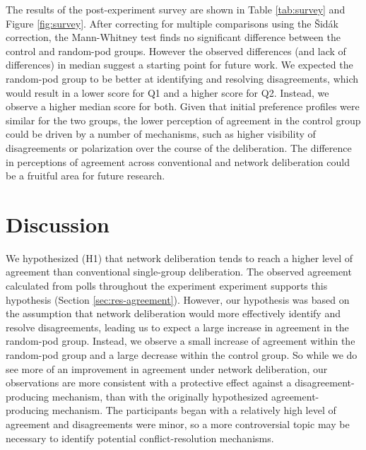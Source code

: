 {The results of the post-experiment survey are shown in Table \ref{tab:survey} and Figure \ref{fig:survey}.
After correcting for multiple comparisons using the Šidák correction, the Mann-Whitney test finds no significant difference between the control and random-pod groups.
However the observed differences (and lack of differences) in median suggest a starting point for future work.
We expected the random-pod group to be better at identifying and resolving disagreements, which would result in a lower score for Q1 and a higher score for Q2.
Instead, we observe a higher median score for both.
Given that initial preference profiles were similar for the two groups, the lower perception of agreement in the control group could be driven by a number of mechanisms, such as higher visibility of disagreements or polarization over the course of the deliberation.
The difference in perceptions of agreement across conventional and network deliberation could be a fruitful area for future research.

\section{Discussion}
\label{sec:discussion}

We hypothesized (H1) that network deliberation tends to reach a higher level of agreement than conventional single-group deliberation.
The observed agreement calculated from polls throughout the experiment experiment supports this hypothesis (Section \ref{sec:res-agreement}).
However, our hypothesis was based on the assumption that network deliberation would more effectively identify and resolve disagreements,
leading us to expect a large increase in agreement in the random-pod group.
Instead, we observe a small increase of agreement within the random-pod group and a large decrease within the control group.
So while we do see more of an improvement in agreement under network deliberation, our observations are more consistent with a protective effect against a disagreement-producing mechanism, than with the originally hypothesized agreement-producing mechanism.
The participants began with a relatively high level of agreement and disagreements were minor, so a more controversial topic may be necessary to identify potential conflict-resolution mechanisms.

}
